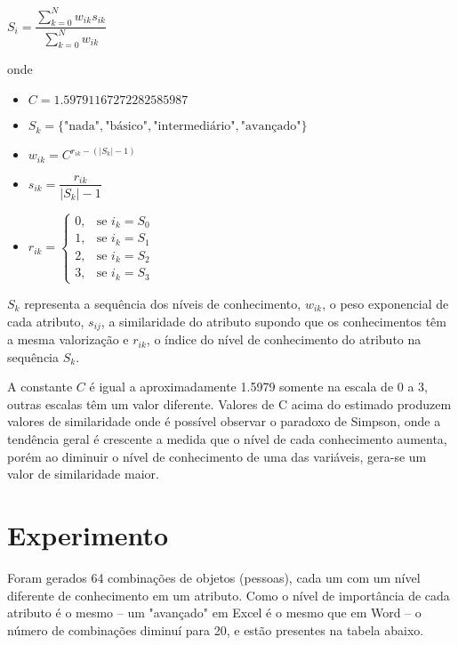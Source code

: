 \documentclass[]{article}
\begin{document}
		\begin{center}
			$ S_i = \dfrac{\sum_{k = 0}^N w_{ik}s_{ik}}{\sum_{k = 0}^N w_{ik}} $	
		\end{center}
		
		onde
		
		\begin{itemize}
			
		 \item  $ C = 1.59791167272282585987 $
		
		 \item $ S_k = \{ \mbox{"nada"}, \mbox{"básico"}, \mbox{"intermediário"}, \mbox{"avançado"} \} $
			
	     \item 	$ w_{ik} = C^{r_{ik} - (| S_k | - 1)} $
			
		 \item $ s_{ik} = \dfrac{r_{ik}}{| S_k | - 1} $
		
		 \item $ r_{ik} = \begin{cases}
			        0, & \mbox{se } i_k = S_0 \\ 
			        1, & \mbox{se } i_k = S_1 \\
			        2, & \mbox{se } i_k = S_2 \\
		    		3, & \mbox{se } i_k = S_3 
	        \end{cases} $
        \end{itemize}
    
        
        $ S_k $ representa a sequência dos níveis de conhecimento, $ w_{ik} $, o peso exponencial de cada atributo, $ s_{ij} $, a similaridade do atributo supondo que os conhecimentos têm a mesma valorização e $ r_{ik} $, o índice do nível de conhecimento do atributo na sequência $ S_k $.
        
       A constante $ C $ é igual a aproximadamente 1.5979 somente na escala de 0 a 3, outras escalas têm um valor diferente. Valores de C acima do estimado produzem valores de similaridade onde é possível observar o paradoxo de Simpson, onde a tendência geral é crescente a medida que o nível de cada conhecimento aumenta, porém ao diminuir o nível de conhecimento de uma das variáveis, gera-se um valor de similaridade maior. 
    
        
	\section{Experimento}
		Foram gerados 64 combinações de objetos (pessoas), cada um com um nível diferente de conhecimento em um atributo. Como o nível de importância de cada atributo é o mesmo – um "avançado" em Excel é o mesmo que em Word – o número de combinações diminuí para 20, e estão presentes na tabela abaixo.
		
\end{document}
